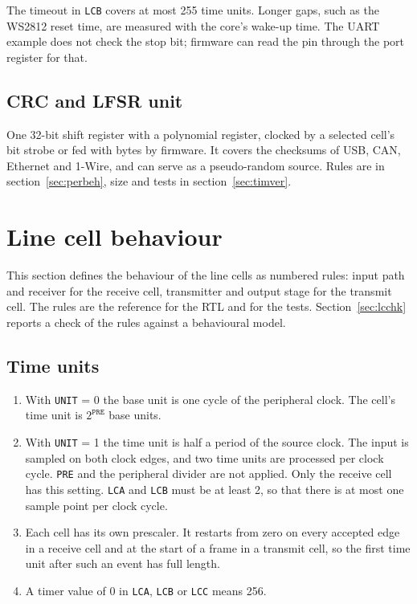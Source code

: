 \documentclass[10pt,a4paper]{article}
\newcommand{\reg}[1]{\texttt{#1}}
\begin{document}
The timeout in \reg{LCB} covers at most 255 time units. Longer gaps, such as the WS2812 reset time, are
measured with the core's wake-up time. The UART example does not check the stop bit; firmware can read the pin through the port register for that.

\subsection{CRC and LFSR unit}

One 32-bit shift register with a polynomial register, clocked by a selected cell's bit strobe or fed with
bytes by firmware. It covers the checksums of USB, CAN, Ethernet and 1-Wire, and can serve as a pseudo-random
source. Rules are in section~\ref{sec:perbeh}, size and tests in section~\ref{sec:timver}.

\section{Line cell behaviour}\label{sec:lcbeh}

This section defines the behaviour of the line cells as numbered rules: input path and receiver for the receive cell, transmitter and output stage for the transmit cell. The rules are the reference for the RTL
and for the tests. Section~\ref{sec:lcchk} reports a check of the rules against a behavioural model.

\subsection{Time units}

\begin{enumerate}[label=\textbf{T\arabic*},leftmargin=2.6em]
\item With \reg{UNIT} = 0 the base unit is one cycle of the peripheral clock. The cell's time unit is $2^{\mathtt{PRE}}$
base units.
\item With \reg{UNIT} = 1 the time unit is half a period of the source clock. The input is sampled on both clock
edges, and two time units are processed per clock cycle. \reg{PRE} and the peripheral divider are not applied.
Only the receive cell has this setting. \reg{LCA} and \reg{LCB} must be at least 2, so that there is at most one sample point per clock cycle.
\item Each cell has its own prescaler. It restarts from zero on every accepted edge in a receive cell and at the start of a frame in a transmit cell, so the first
time unit after such an event has full length.
\item A timer value of 0 in \reg{LCA}, \reg{LCB} or \reg{LCC} means 256.
\end{enumerate}
\end{document}
